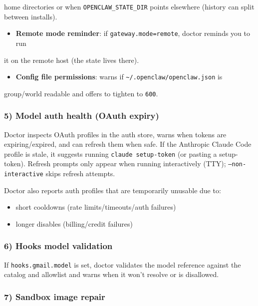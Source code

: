 home directories or when \texttt{OPENCLAW\_STATE\_DIR} points elsewhere (history can
split between installs).
\begin{itemize}
  \item \textbf{Remote mode reminder}: if \texttt{gateway.mode=remote}, doctor reminds you to run
\end{itemize}

it on the remote host (the state lives there).
\begin{itemize}
  \item \textbf{Config file permissions}: warns if \texttt{\textasciitilde{}/.openclaw/openclaw.json} is
\end{itemize}

group/world readable and offers to tighten to \texttt{600}.

\subsubsection{5) Model auth health (OAuth expiry)}


Doctor inspects OAuth profiles in the auth store, warns when tokens are
expiring/expired, and can refresh them when safe. If the Anthropic Claude Code
profile is stale, it suggests running \texttt{claude setup-token} (or pasting a setup-token).
Refresh prompts only appear when running interactively (TTY); \texttt{--non-interactive}
skips refresh attempts.

Doctor also reports auth profiles that are temporarily unusable due to:

\begin{itemize}
  \item short cooldowns (rate limits/timeouts/auth failures)
  \item longer disables (billing/credit failures)
\end{itemize}


\subsubsection{6) Hooks model validation}


If \texttt{hooks.gmail.model} is set, doctor validates the model reference against the
catalog and allowlist and warns when it won’t resolve or is disallowed.

\subsubsection{7) Sandbox image repair}



